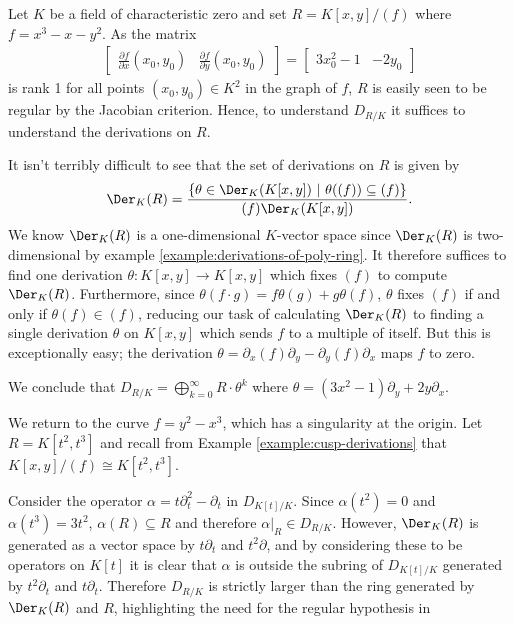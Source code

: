 \begin{example}\label{example:elliptic-curve}
	Let $K$ be a field of characteristic zero and set $R = K[x,y]/(f)$ where $f = x^3 - x - y^2$. As the matrix
	\begin{align*}
		\begin{bmatrix}
			\frac{\partial f}{\partial x}(x_0,y_0) & \frac{\partial f}{\partial y}(x_0, y_0)
		\end{bmatrix}
		=
		\begin{bmatrix}
			3x_0^2 - 1 & -2y_0
		\end{bmatrix}
	\end{align*}
	is rank 1 for all points $(x_0,y_0)\in K^2$ in the graph of $f$, $R$ is easily seen to be regular by the Jacobian criterion. Hence, to understand $D_{R/K}$ it suffices to understand the derivations on $R$.

	It isn't terribly difficult to see that the set of derivations on $R$ is given by
	\begin{align*}
		\Der_K(R) = \frac{\{\theta \in \Der_K(K[x,y])~|~ \theta((f)) \subseteq (f)\}}{(f)\Der_K(K[x,y])}.
	\end{align*}
	We know $\Der_K(R)$ is a one-dimensional $K$-vector space since $\Der_K(R)$ is two-dimensional by example \ref{example:derivations-of-poly-ring}. It therefore suffices to find one derivation $\theta:K[x,y] \to K[x,y]$ which fixes $(f)$ to compute $\Der_K(R)$. Furthermore, since $\theta(f\cdot g) = f\theta(g) + g\theta(f)$, $\theta$ fixes $(f)$ if and only if $\theta(f) \in (f)$, reducing our task of calculating $\Der_K(R)$ to finding a single derivation $\theta$ on $K[x,y]$ which sends $f$ to a multiple of itself. But this is exceptionally easy; the derivation $\theta = \partial_x(f)\partial_y - \partial_y(f)\partial_x$ maps $f$ to zero.

	We conclude that $D_{R/K} = \bigoplus_{k=0}^\infty R\cdot \theta^k$ where $\theta = (3x^2 - 1)\partial_y + 2y\partial_x$.
\end{example}
\begin{example}\label{example:cubic-not-well-behaved}
	We return to the curve $f = y^2 - x^3$, which has a singularity at the origin. Let $R = K[t^2,t^3]$ and recall from Example \ref{example:cusp-derivations} that $K[x,y]/(f) \cong K[t^2,t^3]$. 

	Consider the operator $\alpha = t\partial_t^2 - \partial_t$ in $D_{K[t]/K}$. Since $\alpha(t^2) = 0$ and $\alpha(t^3) = 3t^2$, $\alpha(R) \subseteq R$ and therefore $\alpha|_{R} \in D_{R/K}$. However, $\Der_K(R)$ is generated as a vector space by $t\partial_t$ and $t^2\partial$, and by considering these to be operators on $K[t]$ it is clear that $\alpha$ is outside the subring of $D_{K[t]/K}$ generated by $t^2\partial_t$ and $t\partial_t$. Therefore $D_{R/K}$ is strictly larger than the ring generated by $\Der_K(R)$ and $R$, highlighting the need for the regular hypothesis in 
\end{example}

